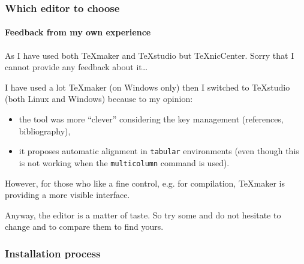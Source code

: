\documentclass[11pt]{beamer}
\begin{document}
\begin{frame}
	\frametitle{Which editor to choose}
	\framesubtitle{Feedback from my own experience}
	
	As I have used both \TeX{}maker and \TeX{}studio but \alert{\TeX{}nicCenter}.
	Sorry that I cannot provide any feedback about it\dots
	
	I have used a lot \alert{\TeX{}maker} (on Windows only) then I switched to  \alert{\TeX{}studio} (both Linux and Windows) because to my opinion:
	\begin{itemize}
		\item the tool was more \enquote{clever} considering the key management (references, bibliography),
		\item it proposes automatic alignment in \texttt{tabular} environments (even though this is not working when the \texttt{multicolumn} command is used).
	\end{itemize}
	However, for those who like a fine control, e.g. for compilation, \TeX{}maker is providing a more visible interface.
	
	Anyway, the editor is a matter of taste. So try some and do not hesitate to change and to compare them to find yours.
\end{frame}


\begin{frame}
	\frametitle{Installation process}
	
\end{frame}

  
\end{document}
